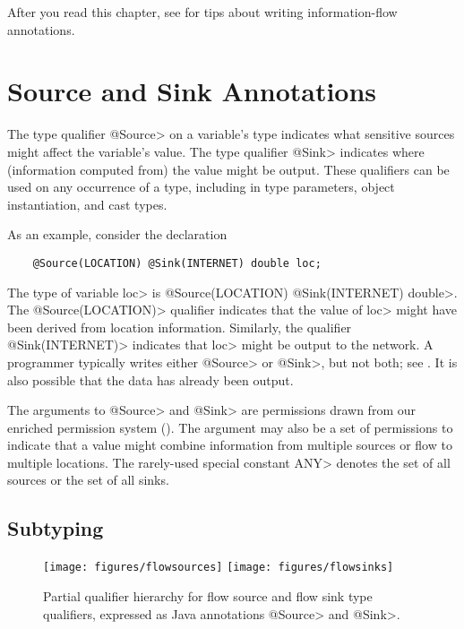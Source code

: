After you read this chapter, see  for tips about
writing information-flow annotations.


\section{Source and Sink Annotations\label{sec:flow-type-system}}


The type qualifier \<@Source> on a variable's
type indicates what sensitive sources might affect the variable's value.
The type qualifier \<@Sink> indicates where (information computed from) the
value might be output.
These qualifiers can be used on any occurrence
of a type, including in type parameters, object instantiation, and cast types.


As an example, consider the declaration

\begin{Verbatim}
    @Source(LOCATION) @Sink(INTERNET) double loc;
\end{Verbatim}

\noindent
The type of variable \<loc> is \<@Source(LOCATION) @Sink(INTERNET)
double>.
The \<@Source(LOCATION)> qualifier indicates that the
value of \<loc> might have been derived from
location information.
Similarly, the qualifier \<@Sink(INTERNET)> indicates that
\<loc> might be output to the network.
A programmer typically writes either \<@Source> or \<@Sink>, but not both;
see .  It is also
possible that the data has already been output.

The arguments to \<@Source> and \<@Sink> are permissions
drawn from our enriched permission system ().
The argument may also be a set of permissions to indicate that a value
might combine information from 
multiple sources or flow to multiple locations.
The rarely-used special constant \<ANY> denotes the set of all sources or the set of all
sinks.


\subsection{Subtyping\label{sec:subtyping}}

\begin{figure}
\centerline{\texttt{[image: figures/flowsources]}%
  \hfill%
  \texttt{[image: figures/flowsinks]}}
\caption{Partial qualifier hierarchy for flow source and flow sink type
  qualifiers, expressed as Java annotations \<@Source> and \<@Sink>.}
\label{fig:flow-hierarchy}
\end{figure}




